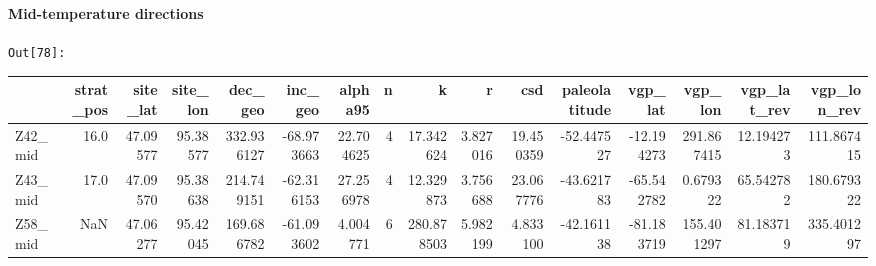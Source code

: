 \documentclass[11pt]{article}
\begin{document}
    \begin{center}
    \end{center}
    { \hspace*{\fill} \\}
    

    \begin{center}
    \end{center}
    { \hspace*{\fill} \\}
    
    \paragraph{Mid-temperature directions}\label{mid-temperature-directions}

\texttt{\color{outcolor}Out[{\color{outcolor}78}]:}
    \begin{sidewaystable}
    {\tiny\begin{tabular}{lrrrrrrrrrrrrrrr}
\toprule
{} &  strat\_pos &  site\_lat &  site\_lon &     dec\_geo &    inc\_geo &    alpha95 &  n &           k &         r &        csd &  paleolatitude &    vgp\_lat &     vgp\_lon &  vgp\_lat\_rev &  vgp\_lon\_rev \\
\midrule
Z42\_mid &       16.0 &  47.09577 &  95.38577 &  332.936127 & -68.973663 &  22.704625 &  4 &   17.342624 &  3.827016 &  19.450359 &     -52.447527 & -12.194273 &  291.867415 &    12.194273 &   111.867415 \\
Z43\_mid &       17.0 &  47.09570 &  95.38638 &  214.749151 & -62.316153 &  27.256978 &  4 &   12.329873 &  3.756688 &  23.067776 &     -43.621783 & -65.542782 &    0.679322 &    65.542782 &   180.679322 \\
Z58\_mid &        NaN &  47.06277 &  95.42045 &  169.686782 & -61.093602 &   4.004771 &  6 &  280.878503 &  5.982199 &   4.833100 &     -42.161138 & -81.183719 &  155.401297 &    81.183719 &   335.401297 \\
\bottomrule
\end{tabular}}
\end{sidewaystable}
    


    \begin{center}
    \end{center}
    { \hspace*{\fill} \\}
    
\end{document}
